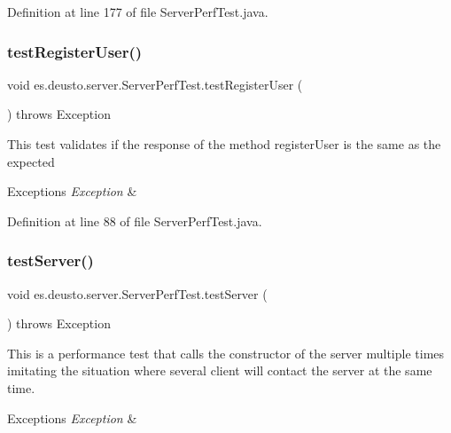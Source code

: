 Definition at line 177 of file Server\+Perf\+Test.\+java.

\mbox{\label{classes_1_1deusto_1_1server_1_1_server_perf_test_acd84ae388a6b45b90f056d6c051908c6}} 
\subsubsection{\texorpdfstring{test\+Register\+User()}{testRegisterUser()}}
{\footnotesize\ttfamily void es.\+deusto.\+server.\+Server\+Perf\+Test.\+test\+Register\+User (\begin{DoxyParamCaption}{ }\end{DoxyParamCaption}) throws Exception}

This test validates if the response of the method register\+User is the same as the expected 
\begin{DoxyExceptions}{Exceptions}
{\em Exception} & \\
\hline
\end{DoxyExceptions}


Definition at line 88 of file Server\+Perf\+Test.\+java.

\mbox{\label{classes_1_1deusto_1_1server_1_1_server_perf_test_a5c187f8b48709153430bb3e21d392315}} 
\subsubsection{\texorpdfstring{test\+Server()}{testServer()}}
{\footnotesize\ttfamily void es.\+deusto.\+server.\+Server\+Perf\+Test.\+test\+Server (\begin{DoxyParamCaption}{ }\end{DoxyParamCaption}) throws Exception}

This is a performance test that calls the constructor of the server multiple times imitating the situation where several client will contact the server at the same time. 
\begin{DoxyExceptions}{Exceptions}
{\em Exception} & \\
\hline
\end{DoxyExceptions}


